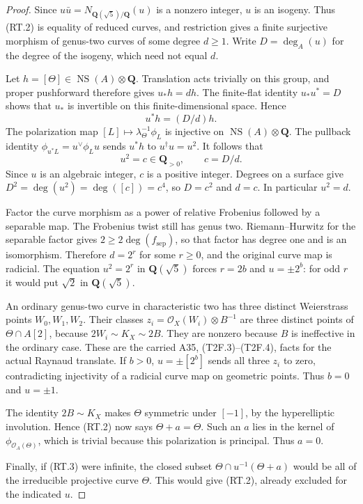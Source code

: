 \documentclass[11pt,a4paper]{article}
\theoremstyle{definition}
\begin{document}
\begin{proof}
Since $u\bar u=N_{\mathbf Q(\sqrt5)/\mathbf Q}(u)$ is a nonzero
integer, $u$ is an isogeny.  Thus (RT.2) is equality of reduced
curves, and restriction gives a finite surjective morphism of
genus-two curves of some degree $d\ge1$.  Write $D=\deg_A(u)$
for the degree of the isogeny, which need not equal $d$.

Let $h=[\Theta]\in\operatorname{NS}(A)\otimes\mathbf Q$.
Translation acts trivially on this group, and proper pushforward
therefore gives $u_*h=d h$.  The finite-flat identity
$u_*u^*=D$ shows that $u_*$ is invertible on this finite-dimensional
space.  Hence
\[
                       u^*h=(D/d)h.                          \tag{RT.4}
\]
The polarization map $[L]\mapsto\lambda_\Theta^{-1}\phi_L$
is injective on $\operatorname{NS}(A)\otimes\mathbf Q$.
The pullback identity
$\phi_{u^*L}=u^\vee\phi_Lu$ sends $u^*h$ to $u^\dagger u=u^2$.
It follows that
\[
                   u^2=c\in\mathbf Q_{>0},\qquad c=D/d.
                                                               \tag{RT.5}
\]
Since $u$ is an algebraic integer, $c$ is a positive integer.
Degrees on a surface give
$D^2=\deg(u^2)=\deg([c])=c^4$, so $D=c^2$ and $d=c$.
In particular $u^2=d$.

Factor the curve morphism as a power of relative Frobenius
followed by a separable map.  The Frobenius twist still has
genus two.  Riemann--Hurwitz for the separable factor gives
$2\ge2\deg(f_{\mathrm{sep}})$, so that factor has degree one
and is an isomorphism.  Therefore $d=2^r$ for some $r\ge0$,
and the original curve map is radicial.  The equation
$u^2=2^r$ in $\mathbf Q(\sqrt5)$ forces $r=2b$ and
$u=\pm2^b$: for odd $r$ it would put $\sqrt2$ in
$\mathbf Q(\sqrt5)$.

An ordinary genus-two curve in characteristic two has three
distinct Weierstrass points $W_0,W_1,W_2$.  Their classes
$z_i=\mathcal O_X(W_i)\otimes B^{-1}$ are three distinct
points of $\Theta\cap A[2]$, because $2W_i\sim K_X\sim2B$.
They are nonzero because $B$ is ineffective in the ordinary
case.  These are the carried A35, (T2F.3)--(T2F.4), facts for
the actual Raynaud translate.  If $b>0$, $u=\pm[2^b]$ sends
all three $z_i$ to zero, contradicting injectivity of a
radicial curve map on geometric points.  Thus $b=0$ and
$u=\pm1$.

The identity $2B\sim K_X$ makes $\Theta$ symmetric under
$[-1]$, by the hyperelliptic involution.  Hence (RT.2) now says
$\Theta+a=\Theta$.  Such an $a$ lies in the kernel of
$\phi_{\mathcal O_A(\Theta)}$, which is trivial because this
polarization is principal.  Thus $a=0$.

Finally, if (RT.3) were infinite, the closed subset
$\Theta\cap u^{-1}(\Theta+a)$ would be all of the irreducible
projective curve $\Theta$.  This would give (RT.2), already
excluded for the indicated $u$.
\end{proof}
\end{document}
